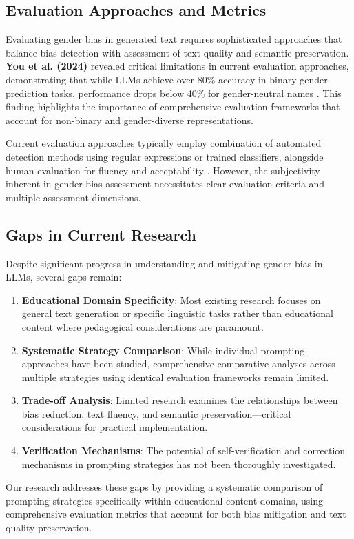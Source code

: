 \subsection{Evaluation Approaches and Metrics}

Evaluating gender bias in generated text requires sophisticated approaches that balance bias detection with assessment of text quality and semantic preservation. \textbf{You et al. (2024)} revealed critical limitations in current evaluation approaches, demonstrating that while LLMs achieve over 80\% accuracy in binary gender prediction tasks, performance drops below 40\% for gender-neutral names \cite{you2024beyondbinary}. This finding highlights the importance of comprehensive evaluation frameworks that account for non-binary and gender-diverse representations.

Current evaluation approaches typically employ combination of automated detection methods using regular expressions or trained classifiers, alongside human evaluation for fluency and acceptability \cite{savoldi2024neutraltranslation}. However, the subjectivity inherent in gender bias assessment necessitates clear evaluation criteria and multiple assessment dimensions.

\subsection{Gaps in Current Research}

Despite significant progress in understanding and mitigating gender bias in LLMs, several gaps remain:

\begin{enumerate}
    \item \textbf{Educational Domain Specificity}: Most existing research focuses on general text generation or specific linguistic tasks rather than educational content where pedagogical considerations are paramount.
    
    \item \textbf{Systematic Strategy Comparison}: While individual prompting approaches have been studied, comprehensive comparative analyses across multiple strategies using identical evaluation frameworks remain limited.
    
    \item \textbf{Trade-off Analysis}: Limited research examines the relationships between bias reduction, text fluency, and semantic preservation—critical considerations for practical implementation.
    
    \item \textbf{Verification Mechanisms}: The potential of self-verification and correction mechanisms in prompting strategies has not been thoroughly investigated.
\end{enumerate}

Our research addresses these gaps by providing a systematic comparison of prompting strategies specifically within educational content domains, using comprehensive evaluation metrics that account for both bias mitigation and text quality preservation.
